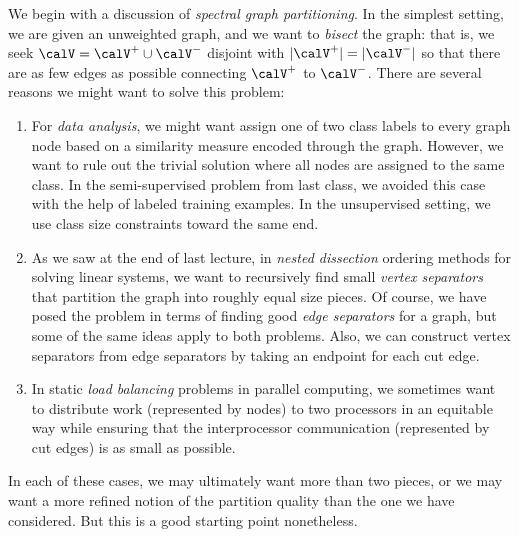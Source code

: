\documentclass[12pt, leqno]{article} %
\begin{document}
We begin with a discussion of {\em spectral graph partitioning}.
In the simplest setting, we are given an unweighted graph, and
we want to {\em bisect} the graph:
that is, we seek $\calV = \calV^+ \cup \calV^-$ disjoint with
$|\calV^+| = |\calV^-|$ so that there are as few edges as possible
connecting $\calV^+$ to $\calV^-$.  There are several reasons
we might want to solve this problem:
\begin{enumerate}
\item For {\em data analysis}, we might want assign one of two class labels
  to every graph node based on a similarity measure encoded through
  the graph.  However, we want to rule out the trivial solution where
  all nodes are assigned to the same class.  In the semi-supervised
  problem from last class, we avoided this case with the help of
  labeled training examples.  In the unsupervised setting, we use
  class size constraints toward the same end.
\item As we saw at the end of last lecture, in {\em nested dissection}
  ordering methods for solving linear systems, we want to recursively
  find small {\em vertex separators} that partition the graph into
  roughly equal size pieces.  Of course, we have posed the problem in
  terms of finding good {\em edge separators} for a graph, but
  some of the same ideas apply to both problems.  Also, we can
  construct vertex separators from edge separators by taking an
  endpoint for each cut edge.
\item In static {\em load balancing} problems in parallel computing,
  we sometimes want to distribute work (represented by nodes) to two
  processors in an equitable way while ensuring that the
  interprocessor communication (represented by cut edges) is as small
  as possible.
\end{enumerate}
In each of these cases, we may ultimately want more than two pieces,
or we may want a more refined notion of the partition quality than the
one we have considered.  But this is a good starting point nonetheless.
\end{document}
